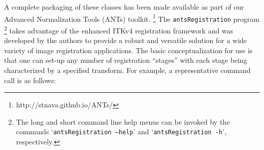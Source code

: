 \documentclass{frontiersSCNS}
\begin{document}
A complete packaging of these classes has been made
available as part of our Advanced Normalization Tools (ANTs) toolkit.%
\footnote{
http://stnava.github.io/ANTs/
}
The \verb#antsRegistration# program%
\footnote{
The long and short command line help menus can be invoked by
the commands `{\tt antsRegistration --help}' and `{\tt antsRegistration -h}', respectively.
}
takes advantage of the enhanced ITKv4
registration framework and was developed by the 
authors to provide a robust and versatile solution for a wide variety of
image registration applications. The basic conceptualization for use is that one 
can
set-up any number of registration ``stages'' with each stage being 
characterized by a specified transform.  For example, a representative 
command call is as follows:
\vspace{2mm}
\end{document}
